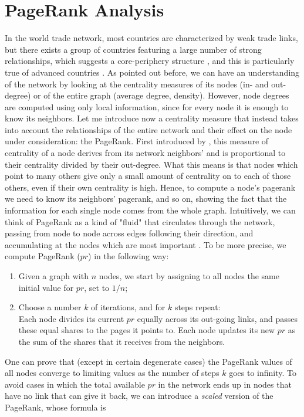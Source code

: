 \pagebreak
\section{PageRank Analysis}

In the world trade network, most countries are characterized by weak trade links, but there exists a group of countries featuring a large number of strong relationships, which suggests a core-periphery structure \cite{fagiolo}, and this is particularly true of advanced countries \cite{deguchi}. As pointed out before, we can have an understanding of the network by looking at the centrality measures of its nodes (in- and out-degree) or of the entire graph (average degree, density). However, node degrees are computed using only local information, since for every node it is enough to know its neighbors. Let me introduce now a centrality measure that instead takes into account the relationships of the entire network and their effect on the node under consideration: the PageRank. 
First introduced by \textcite{page1999pagerank}, this measure of centrality of a node derives from its network neighbors' and is proportional to their centrality divided by their out-degree. What this means is that nodes which point to many others give only a small amount of centrality on to each of those others, even if their own centrality is high. Hence, to compute a node's pagerank we need to know its neighbors' pagerank, and so on, showing the fact that the information for each single node comes from the whole graph. Intuitively, we can think of PageRank as a kind of "fluid" that circulates through the network, passing from node to node across edges following their direction, and accumulating at the nodes which are most important \cite{easley2012networks}. To be more precise, we compute PageRank ($pr$) in the following way:
\begin{enumerate}
    \item Given a graph with $n$ nodes, we start by assigning to all nodes the same initial value for $pr$, set to $1/n$;
    \item Choose a number $k$ of iterations, and for $k$ steps repeat:\\
            Each node divides its current $pr$ equally across its out-going links, and passes these equal shares to the pages it points to. Each node updates its new $pr$ as the sum of the shares that it receives from the neighbors.
\end{enumerate}
One can prove that (except in certain degenerate cases) the PageRank values of all nodes converge to limiting values as the number of steps $k$ goes to infinity. To avoid cases in which the total available $pr$ in the network ends up in nodes that have no link that can give it back, we can introduce a \textit{scaled} version of the PageRank, whose formula is
